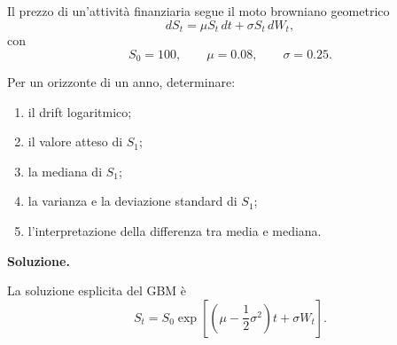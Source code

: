 \begin{exercise}
\label{ex:cap06-gbm-media-mediana}

Il prezzo di un'attivit\`{a} finanziaria segue il moto browniano
geometrico
\[
dS_t=\mu S_t\,dt+\sigma S_t\,dW_t,
\]
con
\[
S_0=100,
\qquad
\mu=0.08,
\qquad
\sigma=0.25.
\]

Per un orizzonte di un anno, determinare:

\begin{enumerate}
\item il drift logaritmico;
\item il valore atteso di $S_1$;
\item la mediana di $S_1$;
\item la varianza e la deviazione standard di $S_1$;
\item l'interpretazione della differenza tra media e mediana.
\end{enumerate}

\end{exercise}

\noindent
\textbf{Soluzione.}

La soluzione esplicita del GBM \`{e}
\[
S_t
=
S_0
\exp\left[
\left(\mu-\frac{1}{2}\sigma^2\right)t+\sigma W_t
\right].
\]

